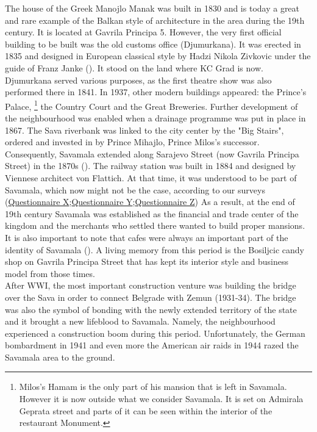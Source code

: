 \documentclass[11pt]{report}
\begin{document}
The house of the Greek Manojlo Manak was built in 1830 and is today a great and rare example of the Balkan style of architecture in the area during the 19th century. It is located at Gavrila Principa 5. However, the very first official building to be built was the old customs office (Djumurkana). It was erected in 1835 and designed in European classical style by Hadzi Nikola Zivkovic under the guide of Franz Janke (\href{Blagojevic}{\citealt{blagojevic_urban_2009}}). It stood on the land where KC Grad is now. Djumurkana served various purposes, as the first theatre show was also performed there in 1841. In 1937, other modern buildings appeared: the Prince's Palace,
\footnote{Milos’s Hamam is the only  part of his mansion that is left in Savamala. However it is now outside what we consider Savamala. It is set on Admirala Geprata street and parts of it can be seen within the interior
of the restaurant Monument.}
the Country Court and the Great Breweries. Further development  of  the  neighbourhood  was  enabled when a drainage programme  was  put  in place  in  1867.  The  Sava  riverbank  was  linked  to the city center by the "Big Stairs", ordered and invested in by Prince Mihajlo, Prince Milos’s successor. Consequently, Savamala  extended along Sarajevo Street (now Gavrila Principa Street) in the 1870s  (\href{Krusche}{\citealt{krusche_bureau_2015}}).
The railway station was built in 1884 and designed by Viennese architect von Flattich. At that time, it was understood to be part of Savamala, which now might not be the case, according to our surveys (\href{Questionnaire Experts Savamala}{Questionnaire X};\href{Questionnaire Experts Savamala}{Questionnaire Y};\href{Questionnaire Experts Savamala}{Questionnaire Z})
As a result, at the end of 19th century Savamala was established as the financial and trade center of the kingdom  and the merchants who settled there wanted to build proper mansions. It is also important to note that cafes were always an important part of the identity of Savamala  (\href{Nusic}{\citealt{nusic_kafane_2013}}). A living memory from this period is the Bosiljcic candy shop on Gavrila Principa Street that has kept its interior style and business model from those times.
\\
After WWI, the most important construction venture was building the bridge over the Sava in order to connect Belgrade with Zemun (1931-34). The bridge was also the symbol of bonding with the newly extended territory of the state and it brought a new lifeblood to Savamala. Namely, the neighbourhood experienced a construction boom during this period. Unfortunately, the German bombardment in 1941 and even more the American air raids in 1944 razed the Savamala area to the ground.
\end{document}
